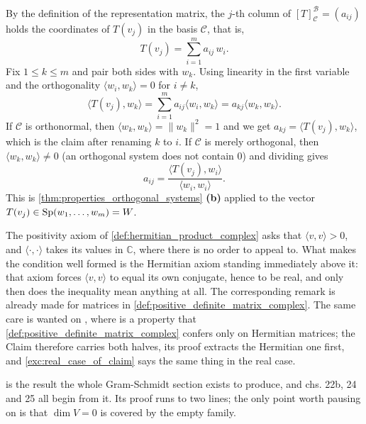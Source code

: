 \begin{exercisesolution}
\label{sol:matrix_representation_orthonormal}
  By the definition of the representation matrix, the $j$-th column of $[T]_{\mathcal{C}}^{\mathcal{B}} = (a_{ij})$ holds the coordinates of $T(v_j)$ in the basis $\mathcal{C}$, that is,
  \[ T(v_j) = \sum_{i=1}^m a_{ij} \, w_i . \]
  Fix $1 \le k \le m$ and pair both sides with $w_k$. Using linearity in the first variable and the orthogonality $\langle w_i, w_k \rangle = 0$ for $i \ne k$,
  \[ \langle T(v_j), w_k \rangle = \sum_{i=1}^m a_{ij} \langle w_i, w_k \rangle = a_{kj} \langle w_k, w_k \rangle . \]
  If $\mathcal{C}$ is orthonormal, then $\langle w_k, w_k \rangle = \|w_k\|^2 = 1$ and we get $a_{kj} = \langle T(v_j), w_k \rangle$, which is the claim after renaming $k$ to $i$. If $\mathcal{C}$ is merely orthogonal, then $\langle w_k, w_k \rangle \ne 0$ (an orthogonal system does not contain $0$) and dividing gives
  \[ a_{ij} = \frac{\langle T(v_j), w_i \rangle}{\langle w_i, w_i \rangle} . \]
  This is \cref{thm:properties_orthogonal_systems} \textbf{(b)} applied to the vector $T(v_j) \in \operatorname{Sp}(w_1, \dots, w_m) = W$.
\end{exercisesolution}



\begin{ainote}
The positivity axiom of \cref{def:hermitian_product_complex} asks that
$\langle v, v \rangle > 0$, and $\langle \cdot, \cdot \rangle$ takes its values
in $\mathbb{C}$, where there is no order to appeal to. What makes the condition
well formed is the Hermitian axiom standing immediately above it: that axiom
forces $\langle v, v \rangle$ to equal its own conjugate, hence to be real, and
only then does the inequality mean anything at all. The corresponding remark is
already made for matrices in \cref{def:positive_definite_matrix_complex}. The
same care is wanted on , where
 is a property that
\cref{def:positive_definite_matrix_complex} confers only on Hermitian matrices;
the Claim therefore carries both halves, its proof extracts the Hermitian one
first, and \cref{exc:real_case_of_claim} says the same thing in the real case.

 is the result the whole Gram-Schmidt section
exists to produce, and chs. 22b, 24 and 25 all begin from it. Its proof runs to
two lines; the only point worth pausing on is that $\dim V = 0$ is covered by
the empty family.
\end{ainote}


